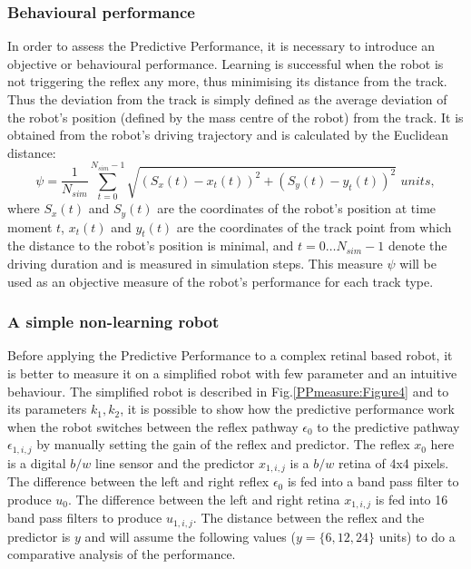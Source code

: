 \subsubsection{Behavioural performance}
In order to assess the Predictive Performance, it is necessary to introduce an objective 
or behavioural performance. 
Learning is successful when the robot is not triggering the reflex any more, thus
minimising its distance from the track.
Thus the deviation from the track is simply defined as the
average deviation of the robot's position (defined by the mass centre
of the robot) from the track.  It is obtained from the robot's driving
trajectory and is calculated by the Euclidean distance:
\begin{equation}
\psi=\frac{1}{N_{sim}} \sum_{t=0}^{N_{sim}-1} \sqrt{(S_x(t)-x_t(t))^2+(S_y(t)-y_t(t))^2} \,\, units,
\label{deviation}
\end{equation}
where $S_x(t)$ and $S_y(t)$ are the coordinates of the robot's
position at time moment $t$, $x_t(t)$ and $y_t(t)$ are the coordinates
of the track point from which the distance to the robot's position is
minimal, and $t=0\ldots N_{sim}-1$ denote the driving duration and is
measured in simulation steps.  This measure $\psi$ will be used as an
objective measure of the robot's performance for each track type.


\subsubsection{A simple non-learning robot}
Before applying the Predictive Performance to a complex retinal based robot, it is
better to measure it on a simplified robot with few parameter and an intuitive behaviour.
The simplified robot is described in Fig.\ref{PPmeasure:Figure4} and to its parameters $k_1,k_2$,
it is possible to show how the predictive performance work when the robot
switches between the reflex pathway $\epsilon_0$ to the predictive pathway $\epsilon_{1,i,j}$ by
manually setting the gain of the reflex and predictor. The reflex
$x_0$ here is a digital $b/w$ line sensor and the predictor $x_{1,i,j}$ is a
$b/w$ retina of 4x4 pixels. The difference between the left and right
reflex $\epsilon_{0}$ is fed into a band pass filter to produce $u_{0}$. The
difference between the left and right retina $x_{1,i,j}$ is fed into 16
band pass filters to produce $u_{1,i,j}$. The distance between the
reflex and the predictor is $y$ and will assume the following values ($y=\{6,12,24\}$ units) 
to do a comparative analysis of the performance.\\

